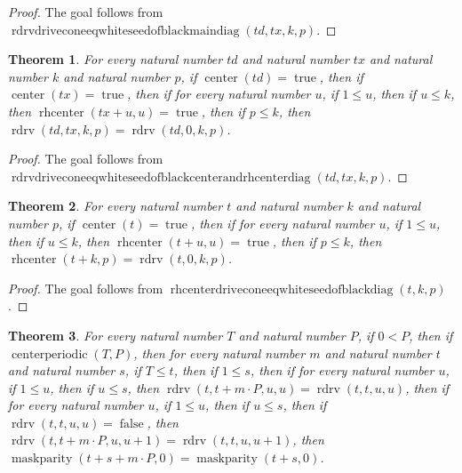 \documentclass[11pt]{article}
\newtheorem{theorem}{Theorem}[section]
\theoremstyle{definition}
\begin{document}
\begin{proof}
The goal follows from \(\operatorname{rdrvdriveconeeqwhiteseedofblackmaindiag}(td, tx, k, p)\).
\end{proof}
\begin{theorem}
\label{ll:paper:rdrv-drive-cone-eq-white-seed-of-black-center-and-rhcenter-diag}
For every natural number \(td\) and natural number \(tx\) and natural number \(k\) and natural number \(p\), if \(\operatorname{center}(td) = \operatorname{true}\), then if \(\operatorname{center}(tx) = \operatorname{true}\), then if for every natural number \(u\), if \(1 \le u\), then if \(u \le k\), then \(\operatorname{rhcenter}(tx + u, u) = \operatorname{true}\), then if \(p \le k\), then \(\operatorname{rdrv}(td, tx, k, p) = \operatorname{rdrv}(td, 0, k, p)\).
\end{theorem}
\begin{proof}
The goal follows from \(\operatorname{rdrvdriveconeeqwhiteseedofblackcenterandrhcenterdiag}(td, tx, k, p)\).
\end{proof}
\begin{theorem}
\label{ll:paper:rhcenter-drive-cone-eq-white-seed-of-black-diag}
For every natural number \(t\) and natural number \(k\) and natural number \(p\), if \(\operatorname{center}(t) = \operatorname{true}\), then if for every natural number \(u\), if \(1 \le u\), then if \(u \le k\), then \(\operatorname{rhcenter}(t + u, u) = \operatorname{true}\), then if \(p \le k\), then \(\operatorname{rhcenter}(t + k, p) = \operatorname{rdrv}(t, 0, k, p)\).
\end{theorem}
\begin{proof}
The goal follows from \(\operatorname{rhcenterdriveconeeqwhiteseedofblackdiag}(t, k, p)\).
\end{proof}
\begin{theorem}
\label{ll:paper:periodic-maskparity-zero-agree-of-main-diag-gate}
For every natural number \(T\) and natural number \(P\), if \(0 < P\), then if \(\operatorname{centerperiodic}(T, P)\), then for every natural number \(m\) and natural number \(t\) and natural number \(s\), if \(T \le t\), then if \(1 \le s\), then if for every natural number \(u\), if \(1 \le u\), then if \(u \le s\), then \(\operatorname{rdrv}(t, t + m \cdot P, u, u) = \operatorname{rdrv}(t, t, u, u)\), then if for every natural number \(u\), if \(1 \le u\), then if \(u \le s\), then if \(\operatorname{rdrv}(t, t, u, u) = \operatorname{false}\), then \(\operatorname{rdrv}(t, t + m \cdot P, u, u + 1) = \operatorname{rdrv}(t, t, u, u + 1)\), then \(\operatorname{maskparity}(t + s + m \cdot P, 0) = \operatorname{maskparity}(t + s, 0)\).
\end{theorem}
\end{document}

